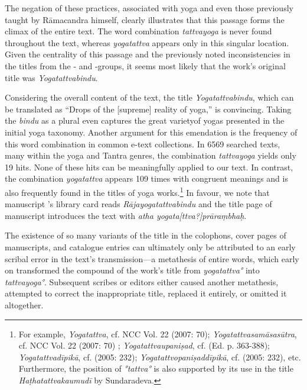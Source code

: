 The negation of these practices, associated with yoga and even those previously taught by Rāmacandra himself, clearly illustrates that this passage forms the climax of the entire text. The word combination \textit{tattvayoga} is never found throughout the text, whereas \textit{yogatattva} appears only in this singular location. Given the centrality of this passage and the previously noted inconsistencies in the titles from the \alpha- and \beta-groups, it seems most likely that the work's original title was \emph{Yogatattvabindu}.

Considering the overall content of the text, the title \textit{Yogatattvabindu}, which can be translated as ``Drops of the [supreme] reality of yoga,'' is convincing. Taking the \textit{bindu} as a plural even captures the great varietyof yogas presented in the initial yoga taxonomy. Another argument for this emendation is the frequency of this word combination in common e-text collections. In 6569 searched texts, many within the yoga and Tantra genres, the combination \textit{tattvayoga} yields only 19 hits. None of these hits can be meaningfully applied to our text. In contrast, the combination \textit{yogatattva} appears 109 times with congruent meanings and is also frequently found in the titles of yoga works.\footnote{For example, \emph{Yogatattva}, cf. NCC Vol. 22 (2007: 70); \emph{Yogatattvasamāsasūtra}, cf. NCC Vol. 22 (2007: 70) \nocite{newcataloguscatalogorum22}; \emph{Yogatattvaupaniṣad}, cf.  (Ed. p. 363-388); \emph{Yogatattvadīpikā}, cf.  (2005: 232); \emph{Yogatattvopaniṣaddīpikā}, cf.  (2005: 232), etc. Furthermore, the position of \emph{°tattva°} is also supported by its use in the title \emph{Haṭhatattvakaumudī} by Sundaradeva.} In favour, we note that manuscript 's library card reads \textit{Rājayogatattvabindu} and the title page of manuscript  introduces the text with \textit{atha yogata[ttva?]prāraṃbhaḥ}. 

The existence of so many variants of the title in the colophons, cover pages of manuscripts, and catalogue entries can ultimately only be attributed to an early scribal error in the text's transmission—a metathesis of entire words, which early on transformed the compound of the work's title from \textit{yogatattva°} into \textit{tattvayoga°}. Subsequent scribes or editors either caused another metathesis, attempted to correct the inappropriate title, replaced it entirely, or omitted it altogether.

